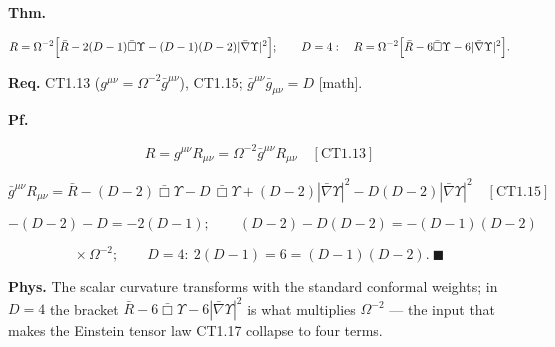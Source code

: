 \begin{theorem}\label{tag:CT1-16}
\textbf{Thm.}

\[
R=\Omega^{-2}\Bigl[\bar R-2(D-1)\bar\Box\Upsilon-(D-1)(D-2)|\bar\nabla\Upsilon|^2\Bigr];\qquad
D=4:\quad R=\Omega^{-2}\Bigl[\bar R-6\bar\Box\Upsilon-6|\bar\nabla\Upsilon|^2\Bigr].
\]

\textbf{Req.} CT1.13 ($g^{\mu\nu}=\Omega^{-2}\bar g^{\mu\nu}$), CT1.15; $\bar g^{\mu\nu}\bar g_{\mu\nu}=D$ [math].

\textbf{Pf.}

\[
R=g^{\mu\nu}R_{\mu\nu}=\Omega^{-2}\bar g^{\mu\nu}R_{\mu\nu}\quad[\mathrm{CT1.13}]
\]

\[
\bar g^{\mu\nu}R_{\mu\nu}=\bar R-(D-2)\bar\Box\Upsilon-D\,\bar\Box\Upsilon+(D-2)|\bar\nabla\Upsilon|^2-D(D-2)|\bar\nabla\Upsilon|^2\quad[\mathrm{CT1.15}]
\]

\[
-(D-2)-D=-2(D-1);\qquad(D-2)-D(D-2)=-(D-1)(D-2)
\]

\[
\times\,\Omega^{-2};\qquad D=4:\ 2(D-1)=6=(D-1)(D-2).\ \blacksquare
\]

\textbf{Phys.} The scalar curvature transforms with the standard conformal weights; in $D=4$ the bracket $\bar R-6\bar\Box\Upsilon-6|\bar\nabla\Upsilon|^2$ is what multiplies $\Omega^{-2}$ — the input that makes the Einstein tensor law CT1.17 collapse to four terms.

\end{theorem}

